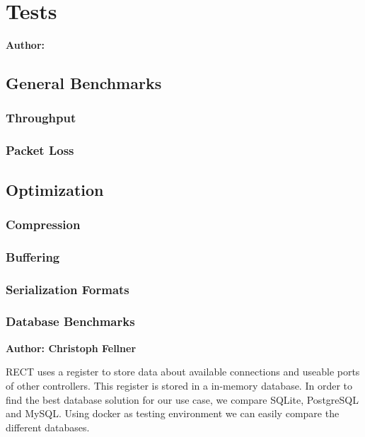 \chapter{Tests}

\textbf{Author: }

\section{General Benchmarks}
\subsection{Throughput}
\subsection{Packet Loss}

\section{Optimization}
\subsection{Compression}
\subsection{Buffering}
\subsection{Serialization Formats}

\subsection{Database Benchmarks}
\textbf{Author: Christoph Fellner}

RECT uses a register to store data about available connections and useable ports of other controllers. This register is stored in a in-memory database. In order to find the 
best database solution for our use case, we compare SQLite, PostgreSQL and MySQL. Using docker as testing environment we can easily compare the different databases.

\filbreak